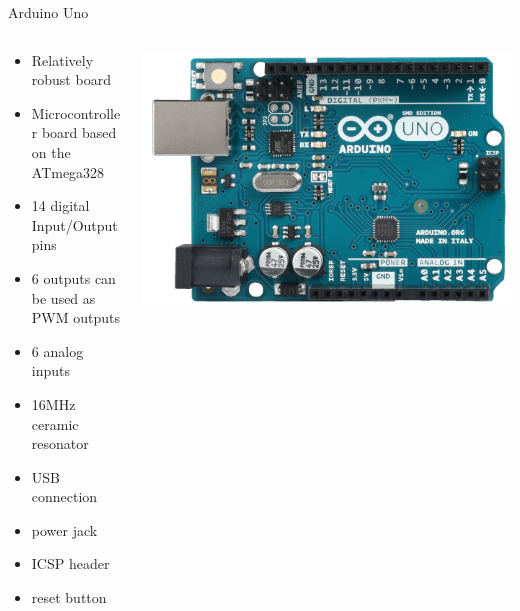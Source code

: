 \documentclass[compress]{beamer}
\begin{document}
\begin{frame}{Arduino Uno}
    \begin{columns}
        \begin{column}{0.5\linewidth}
            \begin{itemize}
                \item Relatively robust board
                \item Microcontroller board based on the ATmega328
                \item 14 digital Input/Output pins
                \item 6 outputs can be used as PWM outputs
                \item 6 analog inputs
                \item 16MHz ceramic resonator
                \item USB connection
                \item power jack
                \item ICSP header
                \item reset button
            \end{itemize}

        \end{column}
        \begin{column}{0.5\linewidth}
            \begin{center}
                \includegraphics[width=\linewidth]{arduino-uno}
            \end{center}
        \end{column}
    \end{columns}
\end{frame}
\end{document}
